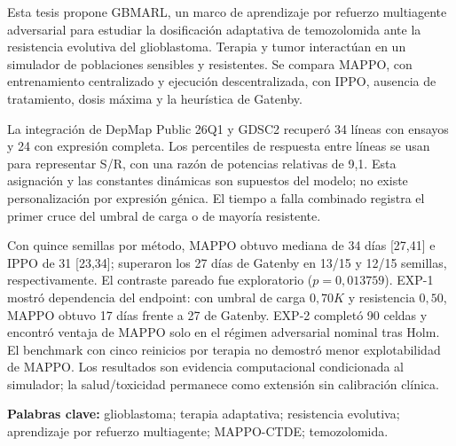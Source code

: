 
Esta tesis propone GBMARL, un marco de aprendizaje por refuerzo multiagente adversarial para estudiar la dosificación adaptativa de temozolomida ante la resistencia evolutiva del glioblastoma. Terapia y tumor interactúan en un simulador de poblaciones sensibles y resistentes. Se compara MAPPO, con entrenamiento centralizado y ejecución descentralizada, con IPPO, ausencia de tratamiento, dosis máxima y la heurística de Gatenby.

La integración de DepMap Public 26Q1 y GDSC2 recuperó 34 líneas con ensayos y 24 con expresión completa. Los percentiles de respuesta entre líneas se usan para representar S/R, con una razón de potencias relativas de 9,1. Esta asignación y las constantes dinámicas son supuestos del modelo; no existe personalización por expresión génica. El tiempo a falla combinado registra el primer cruce del umbral de carga o de mayoría resistente.

Con quince semillas por método, MAPPO obtuvo mediana de 34 días [27,41] e IPPO de 31 [23,34]; superaron los 27 días de Gatenby en 13/15 y 12/15 semillas, respectivamente. El contraste pareado fue exploratorio ($p=0{,}013759$). EXP-1 mostró dependencia del endpoint: con umbral de carga $0{,}70K$ y resistencia $0{,}50$, MAPPO obtuvo 17 días frente a 27 de Gatenby. EXP-2 completó 90 celdas y encontró ventaja de MAPPO solo en el régimen adversarial nominal tras Holm. El benchmark con cinco reinicios por terapia no demostró menor explotabilidad de MAPPO. Los resultados son evidencia computacional condicionada al simulador; la salud/toxicidad permanece como extensión sin calibración clínica.

\noindent \textbf{Palabras clave:} glioblastoma; terapia adaptativa; resistencia evolutiva; aprendizaje por refuerzo multiagente; MAPPO-CTDE; temozolomida.
